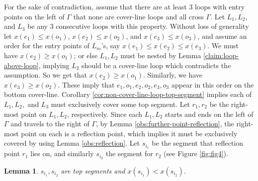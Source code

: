 \documentclass[10pt,a4paper]{amsart}
\theoremstyle{thmstyleone}
\newtheorem{lemma}{Lemma}
\begin{document}
    For the sake of contradiction, assume that there are at least $3$ loops with entry points on the left of $\Gamma$ that none are cover-line loops and all cross $\Gamma$. Let $L_1, L_2$, and $L_3$ be any $3$ consecutive loops with this property. 
    Without loss of generality let $x(e_1) \le x(o_1)$, $x(e_2)\leq x(o_2)$, and $x(e_3)\leq x(o_3)$, and assume an order for the entry points of $L_m$'s, say $x(e_1) \le x(e_2) \le x(e_3)$. We must have $x(e_2) \ge x(o_1)$; or else $L_1,L_2$ must be nested by Lemma \ref{claim:loop-above-loop}, implying $L_2$ should be a cover-line loop which contradicts the assumption.
    So we get that $x(e_2) \ge x(o_1)$. Similarly, we have $x(e_3) \ge x(o_2)$. 
    These imply that $e_1,o_1,e_2,o_2,e_3,o_3$ appear in this order on the bottom cover-line.
    Corollary \ref{cor:non-cover-line-loop-top-segment} implies each of $L_1, L_2,$ and $L_3$ must exclusively cover some top segment.
    Let $r_1,r_2$ be the right-most point on $L_1,L_2$, respectively. 
    Since each $L_1,L_2$ starts and ends on the left of $\Gamma$ and travels to the right of $\Gamma$, by Lemma \ref{obs:further-point-reflection}, the right-most point on each is a reflection point, which implies it must be exclusively covered by using Lemma \ref{obs:reflection}. Let $s_{i_1}$ be the segment that
    reflection point $r_1$ lies on, and similarly $s_{i_2}$ the segment for $r_2$ (see Figure \ref{fig:fig4}).

\begin{lemma}\label{claim:top-segments-on-right}
    $s_{i_1},s_{i_2}$ are top segments and $x(s_{i_1})<x(s_{i_2})$.
\end{lemma}
\end{document}
